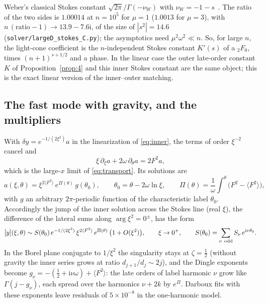 \documentclass{amsart}
\numberwithin{equation}{section}
\theoremstyle{plain}
\theoremstyle{definition}
\theoremstyle{remark}
\newcommand{\iu}{\mathrm{i}}
\newcommand{\repo}[1]{\texttt{#1}}
\begin{document}
Weber's classical Stokes constant $\sqrt{2\pi}/\Gamma(-\nu_W)$ with $\nu_W = -1-s$~\cite[\S12.9]{DLMF}. The ratio of the two
sides is $1.00014$ at $n = 10^5$ for $\mu = 1$ ($1.0013$ for $\mu = 3$), with $n\,(\text{ratio} - 1) \to 13.9 - 7.6\iu$, of
the size of $|s^2| = 14.6$ (\repo{solver/largeD\_stokes\_C.py}); the asymptotics need $\mu^2\omega^2 \ll n$. So, for large $n$,
the light-cone coefficient is the $n$-independent Stokes constant $K'(s)$ of a ${}_2F_0$, times $(n+1)^{s+1/2}$ and a phase. In
the linear case the outer late-order constant $K$ of
Proposition~\ref{prop:4} and this inner Stokes constant are the same object; this is the exact linear version of the
inner--outer matching.

\subsection{The fast mode with gravity, and the multipliers}
With $\delta y = e^{-1/(2\xi^2)}a$ in the linearization of \eqref{eq:inner}, the terms of order $\xi^{-2}$ cancel and
\begin{equation}\label{eq:fastinner}
\xi\,\partial_\xi a + 2\omega\,\partial_\theta a = 2F^2a ,
\end{equation}
which is the large-$x$ limit of \eqref{eq:transport}. Its solutions are
\begin{equation}\label{eq:label}
a(\xi,\theta) = \xi^{2\langle F^2\rangle}\,e^{\Pi(\theta)}\,g(\theta_0),\qquad \theta_0 = \theta - 2\omega\ln\xi,\qquad
\Pi(\theta) = \frac1\omega\int^\theta\big(F^2 - \langle F^2\rangle\big),
\end{equation}
with $g$ an arbitrary $2\pi$-periodic function of the characteristic label $\theta_0$. Accordingly the jump of the inner
solution across the Stokes line (real $\xi$), the difference of the lateral sums along $\arg\xi^2 = 0^\pm$, has the form
\begin{equation}\label{eq:jump}
[y](\xi,\theta) \sim S(\theta_0)\,e^{-1/(2\xi^2)}\,\xi^{2\langle F^2\rangle}\,e^{\Pi(\theta)}\,\big(1 + O(\xi^2)\big),
\qquad \xi\to0^+,\qquad S(\theta_0) = \sum_{\nu\ \rm odd} S_\nu\,e^{\iu\nu\theta_0} .
\end{equation}
In the Borel plane conjugate to $1/\xi^2$ the singularity stays at $\zeta = \tfrac12$ (without gravity the inner series
grows at ratio $d_{j+1}/d_j \sim 2j$), and the Dingle exponents become $g_\nu = -(\tfrac12 + \iu\nu\omega) + \langle F^2\rangle$:
the late orders of label harmonic $\nu$ grow like $\Gamma(j - g_\nu)$, each spread over the harmonics $\nu + 2k$ by
$e^{\Pi}$. Darboux fits with these exponents leave residuals of $5\times10^{-8}$ in the one-harmonic model.
\end{document}
